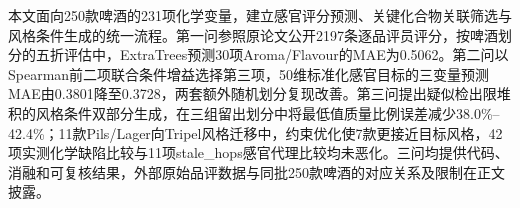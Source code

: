 \documentclass[UTF8,a4paper,12pt,fontset=none]{ctexart}
\begin{document}
\makecoverheading
\begin{papersummary}
本文面向250款啤酒的231项化学变量，建立感官评分预测、关键化合物关联筛选与风格条件生成的统一流程。第一问参照原论文公开2197条逐品评员评分，按啤酒划分的五折评估中，ExtraTrees预测30项Aroma/Flavour的MAE为0.5062。第二问以Spearman前二项联合条件增益选择第三项，50维标准化感官目标的三变量预测MAE由0.3801降至0.3728，两套额外随机划分复现改善。第三问提出疑似检出限堆积的风格条件双部分生成，在三组留出划分中将最低值质量比例误差减少38.0\%--42.4\%；11款Pils/Lager向Tripel风格迁移中，约束优化使7款更接近目标风格，42项实测化学缺陷比较与11项stale\_hops感官代理比较均未恶化。三问均提供代码、消融和可复核结果，外部原始品评数据与同批250款啤酒的对应关系及限制在正文披露。
\end{papersummary}
\makepapertoc
\startpaper

\end{document}
